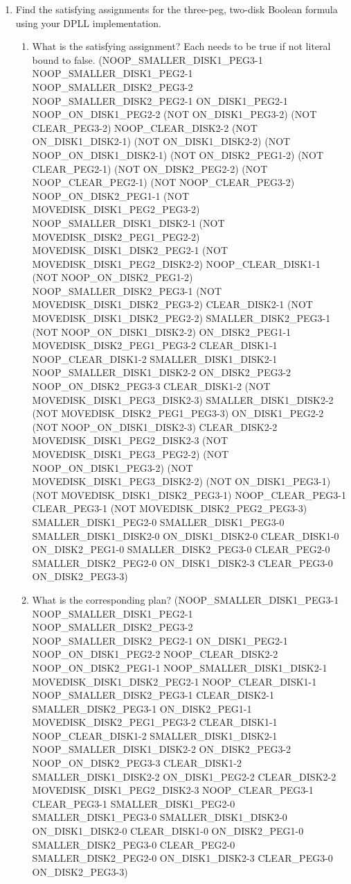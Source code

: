 \documentclass[12pt,letterpaper]{ntdhw}
\begin{document}
\begin{enumerate}
  \item Find the satisfying assignments for the three-peg, two-disk
    Boolean formula using your DPLL implementation.
    \begin{enumerate}
    \item What is the satisfying assignment?
      Each needs to be true if not literal bound to false.
(NOOP_SMALLER_DISK1_PEG3-1 
NOOP_SMALLER_DISK1_PEG2-1 
NOOP_SMALLER_DISK2_PEG3-2
NOOP_SMALLER_DISK2_PEG2-1 
ON_DISK1_PEG2-1 
NOOP_ON_DISK1_PEG2-2
(NOT ON_DISK1_PEG3-2) 
(NOT CLEAR_PEG3-2) 
NOOP_CLEAR_DISK2-2
(NOT ON_DISK1_DISK2-1) 
(NOT ON_DISK1_DISK2-2) 
(NOT NOOP_ON_DISK1_DISK2-1)
(NOT ON_DISK2_PEG1-2) 
(NOT CLEAR_PEG2-1) 
(NOT ON_DISK2_PEG2-2)
(NOT NOOP_CLEAR_PEG2-1) 
(NOT NOOP_CLEAR_PEG3-2) 
NOOP_ON_DISK2_PEG1-1
(NOT MOVEDISK_DISK1_PEG2_PEG3-2) 
NOOP_SMALLER_DISK1_DISK2-1
(NOT MOVEDISK_DISK2_PEG1_PEG2-2) 
MOVEDISK_DISK1_DISK2_PEG2-1
(NOT MOVEDISK_DISK1_PEG2_DISK2-2) 
NOOP_CLEAR_DISK1-1
(NOT NOOP_ON_DISK2_PEG1-2) 
NOOP_SMALLER_DISK2_PEG3-1
(NOT MOVEDISK_DISK1_DISK2_PEG3-2) 
CLEAR_DISK2-1
(NOT MOVEDISK_DISK1_DISK2_PEG2-2) 
SMALLER_DISK2_PEG3-1
(NOT NOOP_ON_DISK1_DISK2-2) 
ON_DISK2_PEG1-1 
MOVEDISK_DISK2_PEG1_PEG3-2
CLEAR_DISK1-1 NOOP_CLEAR_DISK1-2 
SMALLER_DISK1_DISK2-1
NOOP_SMALLER_DISK1_DISK2-2 
ON_DISK2_PEG3-2 
NOOP_ON_DISK2_PEG3-3 
CLEAR_DISK1-2
(NOT MOVEDISK_DISK1_PEG3_DISK2-3) 
SMALLER_DISK1_DISK2-2
(NOT MOVEDISK_DISK2_PEG1_PEG3-3) 
ON_DISK1_PEG2-2 
(NOT NOOP_ON_DISK1_DISK2-3)
CLEAR_DISK2-2 
MOVEDISK_DISK1_PEG2_DISK2-3 
(NOT MOVEDISK_DISK1_PEG3_PEG2-2)
(NOT NOOP_ON_DISK1_PEG3-2) 
(NOT MOVEDISK_DISK1_PEG3_DISK2-2)
(NOT ON_DISK1_PEG3-1) 
(NOT MOVEDISK_DISK1_DISK2_PEG3-1) 
NOOP_CLEAR_PEG3-1
CLEAR_PEG3-1 
(NOT MOVEDISK_DISK2_PEG2_PEG3-3) 
SMALLER_DISK1_PEG2-0
SMALLER_DISK1_PEG3-0 
SMALLER_DISK1_DISK2-0 
ON_DISK1_DISK2-0 
CLEAR_DISK1-0
ON_DISK2_PEG1-0 
SMALLER_DISK2_PEG3-0 CLEAR_PEG2-0 
SMALLER_DISK2_PEG2-0
ON_DISK1_DISK2-3 
CLEAR_PEG3-0 
ON_DISK2_PEG3-3)
\item What is the corresponding plan?
  (NOOP_SMALLER_DISK1_PEG3-1 
NOOP_SMALLER_DISK1_PEG2-1 
NOOP_SMALLER_DISK2_PEG3-2
NOOP_SMALLER_DISK2_PEG2-1 
ON_DISK1_PEG2-1 
NOOP_ON_DISK1_PEG2-2
NOOP_CLEAR_DISK2-2
NOOP_ON_DISK2_PEG1-1
NOOP_SMALLER_DISK1_DISK2-1
MOVEDISK_DISK1_DISK2_PEG2-1
NOOP_CLEAR_DISK1-1
NOOP_SMALLER_DISK2_PEG3-1
CLEAR_DISK2-1
SMALLER_DISK2_PEG3-1
ON_DISK2_PEG1-1 
MOVEDISK_DISK2_PEG1_PEG3-2
CLEAR_DISK1-1 NOOP_CLEAR_DISK1-2 
SMALLER_DISK1_DISK2-1
NOOP_SMALLER_DISK1_DISK2-2 
ON_DISK2_PEG3-2 
NOOP_ON_DISK2_PEG3-3 
CLEAR_DISK1-2
SMALLER_DISK1_DISK2-2
ON_DISK1_PEG2-2 
CLEAR_DISK2-2 
MOVEDISK_DISK1_PEG2_DISK2-3 
NOOP_CLEAR_PEG3-1
CLEAR_PEG3-1 
SMALLER_DISK1_PEG2-0
SMALLER_DISK1_PEG3-0 
SMALLER_DISK1_DISK2-0 
ON_DISK1_DISK2-0 
CLEAR_DISK1-0
ON_DISK2_PEG1-0 
SMALLER_DISK2_PEG3-0 CLEAR_PEG2-0 
SMALLER_DISK2_PEG2-0
ON_DISK1_DISK2-3 
CLEAR_PEG3-0 
ON_DISK2_PEG3-3)
    \end{enumerate}


\end{enumerate}
\end{document}

